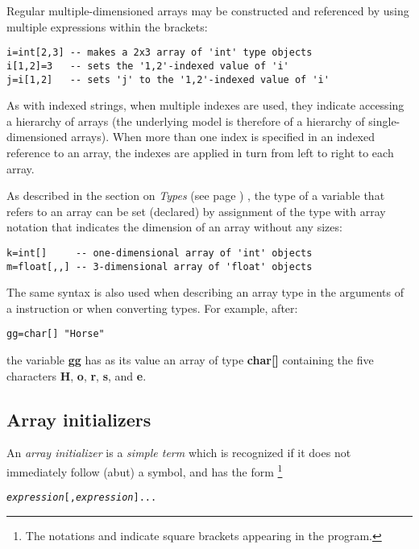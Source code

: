 Regular multiple-dimensioned arrays may be constructed and referenced by
using multiple expressions within the brackets:
\begin{lstlisting}
i=int[2,3] -- makes a 2x3 array of 'int' type objects
i[1,2]=3   -- sets the '1,2'-indexed value of 'i'
j=i[1,2]   -- sets 'j' to the '1,2'-indexed value of 'i'
\end{lstlisting}
 As with indexed strings, when multiple indexes are used, they
indicate accessing a hierarchy of arrays (the underlying model is
therefore of a hierarchy of single-dimensioned arrays).
When more than one index is specified in an indexed reference to an
array, the indexes are applied in turn from left to right to each
array.
 
As described in the section on  \emph{Types} (see page \pageref{reftypes}) , the
type of a variable that refers to an array can be set (declared) by
assignment of the type with array notation that indicates the dimension
of an array without any sizes:
\begin{lstlisting}
k=int[]     -- one-dimensional array of 'int' objects
m=float[,,] -- 3-dimensional array of 'float' objects
\end{lstlisting}

The same syntax is also used when describing an array type in the
arguments of a  instruction or when converting types.
For example, after:
\begin{lstlisting}
gg=char[] "Horse"
\end{lstlisting}
the variable \textbf{gg} has as its value an array of
type \textbf{char[]} containing the five
characters \textbf{H}, \textbf{o}, \textbf{r}, \textbf{s},
and \textbf{e}.
\subsection{Array initializers}\label{refarrin}
 
An \emph{array initializer} is a \emph{simple term} which is
recognized if it does not immediately follow (abut) a symbol, and has
the form
\footnote{
The notations \keyword{'['} and \keyword{']'}
indicate square brackets appearing in the \nr{} program.
}
\begin{alltt}
\keyword{'['}\emph{expression}[,\emph{expression}]...\keyword{']'}
\end{alltt}
 
